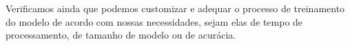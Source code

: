 \documentclass[twoside,conference,a4paper]{IEEEtran}
\begin{document}
Verificamos ainda que podemos customizar e adequar o processo de treinamento do modelo de acordo com nossas necessidades, sejam elas de tempo de processamento, de tamanho de modelo ou de acurácia.








\end{document}
